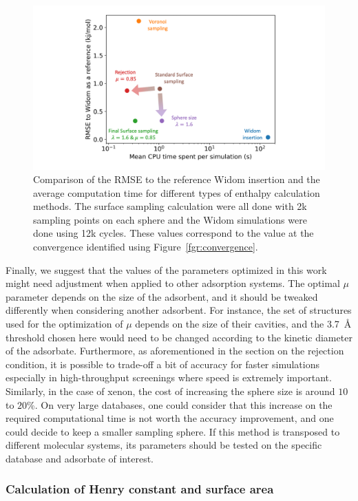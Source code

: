 \documentclass[main]{subfiles}
\begin{document}
\begin{figure}[ht]
\centering
  \includegraphics[width=\linewidth]{figures/3-fastsim/methods_comparison.png}
  \caption{Comparison of the RMSE to the reference Widom insertion and the average computation time for different types of enthalpy calculation methods. The surface sampling calculation were all done with 2k sampling points on each sphere and the Widom simulations were done using 12k cycles. These values correspond to the value at the convergence identified using Figure~\ref{fgr:convergence}. }\label{fgr:sumup}
\end{figure}


Finally, we suggest that the values of the parameters optimized in this work might need adjustment when applied to other adsorption systems. The optimal $\mu$ parameter depends on the size of the adsorbent, and it should be tweaked differently when considering another adsorbent. For instance, the set of structures used for the optimization of $\mu$ depends on the size of their cavities, and the \SI{3.7}{\angstrom} threshold chosen here would need to be changed according to the kinetic diameter of the adsorbate. Furthermore, as aforementioned in the section on the rejection condition, it is possible to trade-off a bit of accuracy for faster simulations especially in high-throughput screenings where speed is extremely important. Similarly, in the case of xenon, the cost of increasing the sphere size is around $10$ to {$20$\%}. On very large databases, one could consider that this increase on the required computational time is not worth the accuracy improvement, and one could decide to keep a smaller sampling sphere. If this method is transposed to different molecular systems, its parameters should be tested on the specific database and adsorbate of interest.


\subsubsection{Calculation of Henry constant and surface area}
\end{document}

